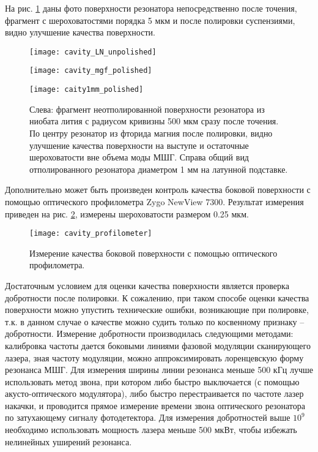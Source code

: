На рис. \ref{cavity_polished} даны фото поверхности резонатора непосредственно после точения, фрагмент с шероховатостями порядка 5 мкм и после полировки суспензиями, видно улучшение качества поверхности.

\begin{figure}[ht]
  \begin{minipage}[ht]{0.32\linewidth}\centering
    \texttt{[image: cavity\_LN\_unpolished]}
  \end{minipage}
  \hfill
  \begin{minipage}[ht]{0.32\linewidth}\centering
    \texttt{[image: cavity\_mgf\_polished]}
  \end{minipage}
  \hfill
  \begin{minipage}[ht]{0.32\linewidth}\centering
    \texttt{[image: caity1mm\_polished]}
  \end{minipage}
  \caption{Слева: фрагмент неотполированной поверхности резонатора из ниобата лития с радиусом кривизны 500 мкм сразу после точения. По центру резонатор из фторида магния после полировки, видно улучшение качества поверхности на выступе и остаточные шероховатости вне объема моды МШГ. Справа общий вид отполированного резонатора диаметром 1 мм на латунной подставке.}
  \label{cavity_polished}
\end{figure}

Дополнительно может быть произведен контроль качества боковой поверхности с помощью оптического профилометра Zygo NewView 7300. Результат измерения приведен на рис. \ref{cavity_profilometer}, измерены шероховатости размером 0.25 мкм.

\begin{figure}[ht]
\centering
  \texttt{[image: cavity\_profilometer]}
  \caption{Измерение качества боковой поверхности с помощью оптического профилометра.}
  \label{cavity_profilometer}
\end{figure}

Достаточным условием для оценки качества поверхности является проверка добротности после полировки. К сожалению, при таком способе оценки качества поверхности можно упустить технические ошибки, возникающие при полировке, т.к. в данном случае о качестве можно судить только по косвенному признаку – добротности. Измерение добротности производилась следующими методами: калибровка частоты дается боковыми линиями фазовой модуляции сканирующего лазера, зная частоту модуляции, можно аппроксимировать лоренцевскую форму резонанса МШГ. Для измерения ширины линии резонанса меньше 500 кГц лучше использовать метод звона, при котором либо быстро выключается (с помощью акусто-оптического модулятора), либо быстро перестраивается по частоте лазер накачки, и проводится прямое измерение времени звона оптического резонатора по затухающему сигналу фотодетектора. Для измерения добротностей выше $10^9$ необходимо использовать мощность лазера меньше 500 мкВт, чтобы избежать нелинейных уширений резонанса.

